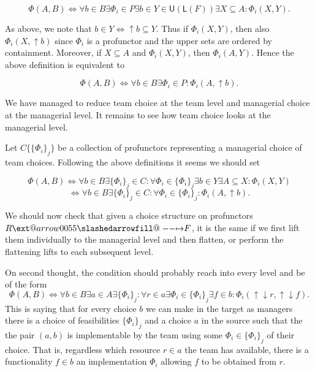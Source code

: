 \documentclass[12pt]{article}
\makeatletter
\theoremstyle{definition}
\theoremstyle{plain}
\theoremstyle{plain}
\theoremstyle{plain}
\theoremstyle{plain}
\theoremstyle{remark}
\theoremstyle{remark}
\newcommand{\sub}{\subseteq}
\newcommand{\low}{\mathsf{L}}
\newcommand{\upper}{\mathsf{U}}
\def\slashedarrowfill@#1#2#3#4#5{%
	$\m@th\thickmuskip0mu\medmuskip\thickmuskip\thinmuskip\thickmuskip
	\relax#5#1\mkern-7mu%
	\cleaders\hbox{$#5\mkern-2mu#2\mkern-2mu$}\hfill
	\mathclap{#3}\mathclap{#2}%
	\cleaders\hbox{$#5\mkern-2mu#2\mkern-2mu$}\hfill
	\mkern-7mu#4$%
}
\def\rightslashedarrowfill@{%
	\slashedarrowfill@\relbar\relbar\mapstochar\rightarrow}
\newcommand\xslashedrightarrow[2][]{%
	\ext@arrow 0055{\rightslashedarrowfill@}{#1}{#2}}
\makeatother
\begin{document}
$$ \Phi(A,B) \iff \forall b \in B \exists \Phi_i \in P \exists b \in Y \in \upper(\low(F)) \exists X \sub A : \Phi_i(X,Y).$$

As above, we note that $b \in Y \iff \uparrow b \sub Y$. Thus if $\Phi_i(X,Y)$, then also $\Phi_i(X,\uparrow b)$ since $\Phi_i$ is a profunctor and the upper sets are ordered by containment. Moreover, if $X \sub A$ and $\Phi_i(X,Y)$, then $\Phi_i(A,Y)$. Hence the above definition is equivalent to 

$$ \Phi(A,B) \iff \forall b \in B \exists \Phi_i \in P : \Phi_i(A,\uparrow b).$$

We have managed to reduce team choice at the team level and managerial choice at the managerial level. It remains to see how team choice looks at the managerial level.

Let $C \{\{\Phi_i\}_j\}$ be a collection of profunctors representing a managerial choice of team choices. Following the above definitions it seems we should set

$$ \Phi(A,B) \iff \forall b \in B \exists \{\Phi_i\}_j \in C : \forall \Phi_i \in \{\Phi_i\}_j \exists b \in  Y \exists A \sub X : \Phi_i(X,Y)$$
$$ \iff \forall b \in B \exists \{\Phi_i\}_j \in C : \forall \Phi_i \in \{\Phi_i\}_j : \Phi_i(A,\uparrow b).$$ 

We should now check that given a choice structure on profunctors $R  \xslashedrightarrow{} F$, it is the same if we first lift them individually to the managerial level and then flatten, or perform the flattening lifts to each subsequent level.

On second thought, the condition should probably reach into every level and be of the form
$$\Phi(A,B) \iff \forall b \in B \exists a \in A \exists \{\Phi_i\}_j: \forall r \in a \exists \Phi_i \in \{\Phi_i\}_j \exists f \in b: \Phi_i(\uparrow\downarrow r, \uparrow\downarrow f).$$
This is saying that for every choice $b$ we can make in the target as managers there is a choice of feasibilities $\{\Phi_i\}_j$ and a choice $a$ in the source such that the the pair $(a,b)$ is implementable by the team using some $\Phi_i \in \{\Phi_i\}_j$ of their choice. That is, regardless which resource $r \in a$ the team has available, there is a functionality $f \in b$ an implementation $\Phi_i$ allowing $f$ to be obtained from $r$.

\newpage
\printbibliography
\end{document}
